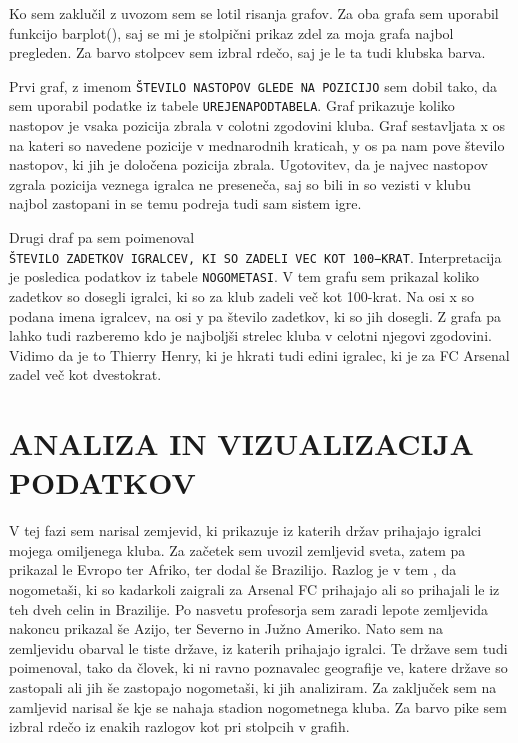 \documentclass[11pt,a4paper]{article}
\begin{document}
Ko sem zaklučil z uvozom sem se lotil risanja grafov. Za oba grafa sem uporabil funkcijo barplot(), saj se mi je stolpični prikaz zdel za moja grafa najbol pregleden. Za barvo stolpcev sem izbral rdečo, saj je le ta tudi klubska barva. 


Prvi graf, z imenom \verb|ŠTEVILO NASTOPOV GLEDE NA POZICIJO| sem dobil tako, da sem uporabil podatke iz tabele \verb|UREJENAPODTABELA|. Graf prikazuje koliko nastopov je vsaka pozicija zbrala v colotni zgodovini kluba. Graf sestavljata x os na kateri so navedene pozicije v mednarodnih kraticah, y os pa nam pove število nastopov, ki jih je določena pozicija zbrala. Ugotovitev, da je najvec nastopov zgrala pozicija veznega igralca ne preseneča, saj so bili in so vezisti v klubu najbol zastopani in se temu podreja tudi sam sistem igre. 


Drugi draf pa sem poimenoval\\\verb|ŠTEVILO ZADETKOV IGRALCEV, KI SO ZADELI VEC KOT 100−KRAT|. Interpretacija je posledica podatkov iz tabele \verb|NOGOMETASI|. V tem grafu sem prikazal koliko zadetkov so dosegli igralci, ki so za klub zadeli več kot 100-krat. Na osi x so podana imena igralcev, na osi y pa število zadetkov, ki so jih dosegli. Z grafa pa lahko tudi razberemo kdo je najboljši strelec kluba v celotni njegovi zgodovini. Vidimo da je to Thierry Henry, ki je hkrati tudi edini igralec, ki je za FC Arsenal zadel več kot dvestokrat.

\newpage
\section{ANALIZA IN VIZUALIZACIJA PODATKOV}

V tej fazi sem narisal zemjevid, ki prikazuje iz katerih držav prihajajo igralci mojega omiljenega kluba. Za začetek sem uvozil zemljevid sveta, zatem pa prikazal le Evropo ter Afriko, ter dodal še Brazilijo. Razlog je v tem , da nogometaši, ki so kadarkoli zaigrali za Arsenal FC prihajajo ali so prihajali le iz teh dveh celin in Brazilije. Po nasvetu profesorja sem zaradi lepote zemljevida nakoncu prikazal še Azijo, ter Severno in Južno Ameriko. Nato sem na zemljevidu obarval le tiste države, iz katerih prihajajo igralci. Te države sem tudi poimenoval, tako da človek, ki ni ravno poznavalec geografije ve, katere države so zastopali ali jih še zastopajo nogometaši, ki jih analiziram. Za zaključek sem na zamljevid narisal še kje se nahaja stadion nogometnega kluba. Za barvo pike sem izbral rdečo iz enakih razlogov kot pri stolpcih v grafih.
\end{document}
